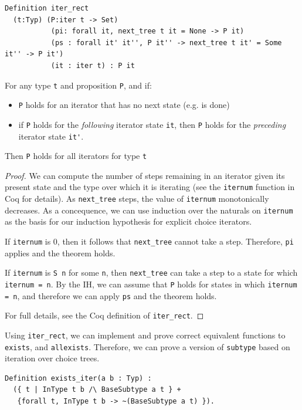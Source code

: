 \documentclass[a4paper,english]{lipics-v2019}
\begin{document}
\begin{theorem}
\begin{small}\begin{verbatim}
Definition iter_rect
  (t:Typ) (P:iter t -> Set)
           (pi: forall it, next_tree t it = None -> P it)
           (ps : forall it' it'', P it'' -> next_tree t it' = Some it'' -> P it')
           (it : iter t) : P it  
\end{verbatim}\end{small}

For any type \verb|t| and proposition \verb|P|, and if:
\begin{itemize} 
	\item \verb|P| holds for an iterator that has no next state (e.g. is done)
	\item if \verb|P| holds for the \emph{following} iterator state \verb|it|,
	then \verb|P| holds for the \emph{preceding} iterator state \verb|it'|.
\end{itemize}
Then \verb|P| holds for all iterators for type \verb|t|
\end{theorem}
\begin{proof}
We can compute the number of steps remaining in an iterator given its present state
and the type over which it is iterating (see the \verb|iternum| function in Coq for
details). As \verb|next_tree| steps, the value of \verb|iternum| monotonically decreases.
As a concequence, we can use induction over the naturals on \verb|iternum| as the basis
for our induction hypothesis for explicit choice iterators.

If \verb|iternum| is 0, then it follows that \verb|next_tree| cannot take a step. Therefore,
\verb|pi| applies and the theorem holds.

If \verb|iternum| is \verb|S n| for some \verb|n|, then \verb|next_tree| can take a step to a state for which
\verb|iternum = n|. By the IH, we can assume that \verb|P| holds for states in which \verb|iternum = n|, 
and therefore we can apply \verb|ps| and the theorem holds.

For full details, see the Coq definition of \verb|iter_rect|.
\end{proof}

Using \verb|iter_rect|, we can implement and prove correct equivalent functions
to \verb|exists|, and \verb|allexists|. Therefore, we can prove a version of \verb|subtype|
based on iteration over choice trees.
\begin{small}\begin{verbatim}
Definition exists_iter(a b : Typ) : 
  ({ t | InType t b /\ BaseSubtype a t } +
   {forall t, InType t b -> ~(BaseSubtype a t) }).
\end{verbatim}\end{small}
\end{document}
